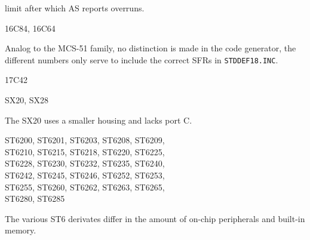 \documentclass[12pt,twoside]{report}
\newcommand{\tty}[1]{{\tt #1}}
\newcommand{\asname}{{AS}}
\begin{document}
limit after which \asname{} reports overruns.
\begin{cpulist}
   16C84, 16C64
\end{cpulist}
Analog to the MCS-51 family, no distinction is made in the code generator,
the different numbers only serve to include the correct SFRs in
\tty{STDDEF18.INC}.
\begin{cpulist}
   17C42
\end{cpulist}
\begin{cpulist}
   SX20, SX28
\end{cpulist}
The SX20 uses a smaller housing and lacks port C.
\begin{cpulist}
   ST6200, ST6201, ST6203, ST6208, ST6209,\\
\> ST6210, ST6215, ST6218, ST6220, ST6225,\\
\> ST6228, ST6230, ST6232, ST6235, ST6240,\\
\> ST6242, ST6245, ST6246, ST6252, ST6253,\\
\> ST6255, ST6260, ST6262, ST6263, ST6265,\\
\> ST6280, ST6285
\end{cpulist}
The various ST6 derivates differ in the amount of
on-chip peripherals and built-in memory.
\end{document}
